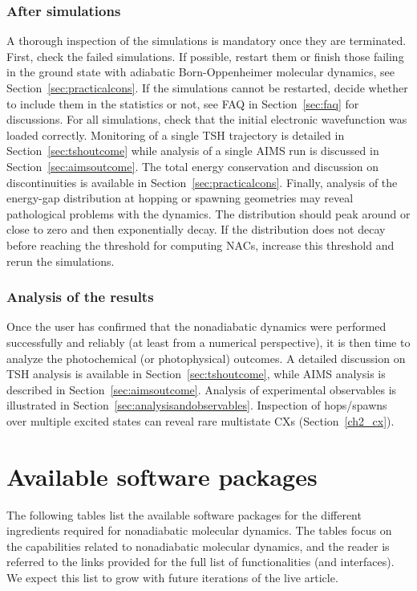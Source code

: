 \documentclass[9pt,bestpractices]{livecoms}
\begin{document}
\subsubsection{After simulations}

A thorough inspection of the simulations is mandatory once they are terminated. First, check the failed simulations. If possible, restart them or finish those failing in the ground state with adiabatic Born-Oppenheimer molecular dynamics, see Section~\ref{sec:practicalcons}. If the simulations cannot be restarted, decide whether to include them in the statistics or not, see FAQ in Section~\ref{sec:faq} for discussions. For all simulations, check that the initial electronic wavefunction was loaded correctly. Monitoring of a single TSH trajectory is detailed in Section~\ref{sec:tshoutcome} while analysis of a single AIMS run is discussed in Section~\ref{sec:aimsoutcome}. The total energy conservation and discussion on discontinuities is available in Section~\ref{sec:practicalcons}. Finally, analysis of the energy-gap distribution at hopping or spawning geometries may reveal pathological problems with the dynamics. The distribution should peak around or close to zero and then exponentially decay. If the distribution does not decay before reaching the threshold for computing NACs, increase this threshold and rerun the simulations.

\subsubsection{Analysis of the results}

Once the user has confirmed that the nonadiabatic dynamics were performed successfully and reliably (at least from a numerical perspective), it is then time to analyze the photochemical (or photophysical) outcomes. A detailed discussion on TSH analysis is available in Section~\ref{sec:tshoutcome}, while AIMS analysis is described in Section~\ref{sec:aimsoutcome}.
Analysis of experimental observables is illustrated in Section~\ref{sec:analysisandobservables}. Inspection of hops/spawns over multiple excited states can reveal rare multistate CXs (Section~\ref{ch2_cx}).


\section{Available software packages}
\label{sec:codes}
The following tables list the available software packages for the different ingredients required for nonadiabatic molecular dynamics. The tables focus on the capabilities related to nonadiabatic molecular dynamics, and the reader is referred to the links provided for the full list of functionalities (and interfaces). We expect this list to grow with future iterations of the live article.
\end{document}

